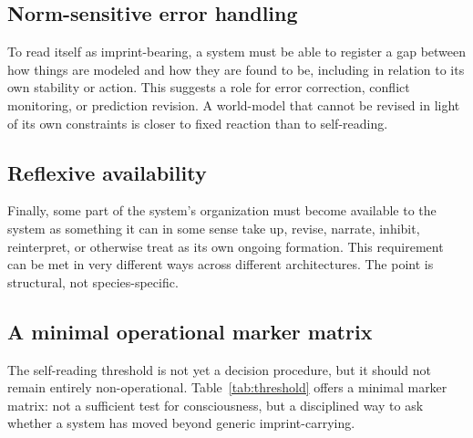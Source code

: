 \documentclass[12pt,a4paper]{article}
\begin{document}
\subsection{Norm-sensitive error handling}

To read itself as imprint-bearing, a system must be able to register a gap between how things are modeled and how they are found to be, including in relation to its own stability or action. This suggests a role for error correction, conflict monitoring, or prediction revision. A world-model that cannot be revised in light of its own constraints is closer to fixed reaction than to self-reading.

\subsection{Reflexive availability}

Finally, some part of the system's organization must become available to the system as something it can in some sense take up, revise, narrate, inhibit, reinterpret, or otherwise treat as its own ongoing formation. This requirement can be met in very different ways across different architectures. The point is structural, not species-specific.

\subsection{A minimal operational marker matrix}

The self-reading threshold is not yet a decision procedure, but it should not remain entirely non-operational. Table~\ref{tab:threshold} offers a minimal marker matrix: not a sufficient test for consciousness, but a disciplined way to ask whether a system has moved beyond generic imprint-carrying.
\end{document}

